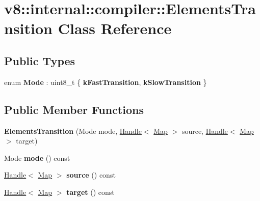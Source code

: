 \hypertarget{classv8_1_1internal_1_1compiler_1_1ElementsTransition}{}\section{v8\+:\+:internal\+:\+:compiler\+:\+:Elements\+Transition Class Reference}
\label{classv8_1_1internal_1_1compiler_1_1ElementsTransition}
\subsection*{Public Types}
\begin{DoxyCompactItemize}
\item 
\mbox{\label{classv8_1_1internal_1_1compiler_1_1ElementsTransition_a55adfade4551a0e829384feea0264e06}} 
enum {\bfseries Mode} \+: uint8\+\_\+t \{ {\bfseries k\+Fast\+Transition}, 
{\bfseries k\+Slow\+Transition}
 \}
\end{DoxyCompactItemize}
\subsection*{Public Member Functions}
\begin{DoxyCompactItemize}
\item 
\mbox{\label{classv8_1_1internal_1_1compiler_1_1ElementsTransition_af76475baee9d675742def03aaa769c47}} 
{\bfseries Elements\+Transition} (Mode mode, \mbox{\hyperlink{classv8_1_1internal_1_1Handle}{Handle}}$<$ \mbox{\hyperlink{classv8_1_1internal_1_1Map}{Map}} $>$ source, \mbox{\hyperlink{classv8_1_1internal_1_1Handle}{Handle}}$<$ \mbox{\hyperlink{classv8_1_1internal_1_1Map}{Map}} $>$ target)
\item 
\mbox{\label{classv8_1_1internal_1_1compiler_1_1ElementsTransition_ae5eaa01383fcfcd6ad192dcd908a683f}} 
Mode {\bfseries mode} () const
\item 
\mbox{\label{classv8_1_1internal_1_1compiler_1_1ElementsTransition_a665a4b2e6395245b7dfaabf66cfb6d5b}} 
\mbox{\hyperlink{classv8_1_1internal_1_1Handle}{Handle}}$<$ \mbox{\hyperlink{classv8_1_1internal_1_1Map}{Map}} $>$ {\bfseries source} () const
\item 
\mbox{\label{classv8_1_1internal_1_1compiler_1_1ElementsTransition_a88251971e983fcf0115e7a9bde2dea6b}} 
\mbox{\hyperlink{classv8_1_1internal_1_1Handle}{Handle}}$<$ \mbox{\hyperlink{classv8_1_1internal_1_1Map}{Map}} $>$ {\bfseries target} () const
\end{DoxyCompactItemize}


